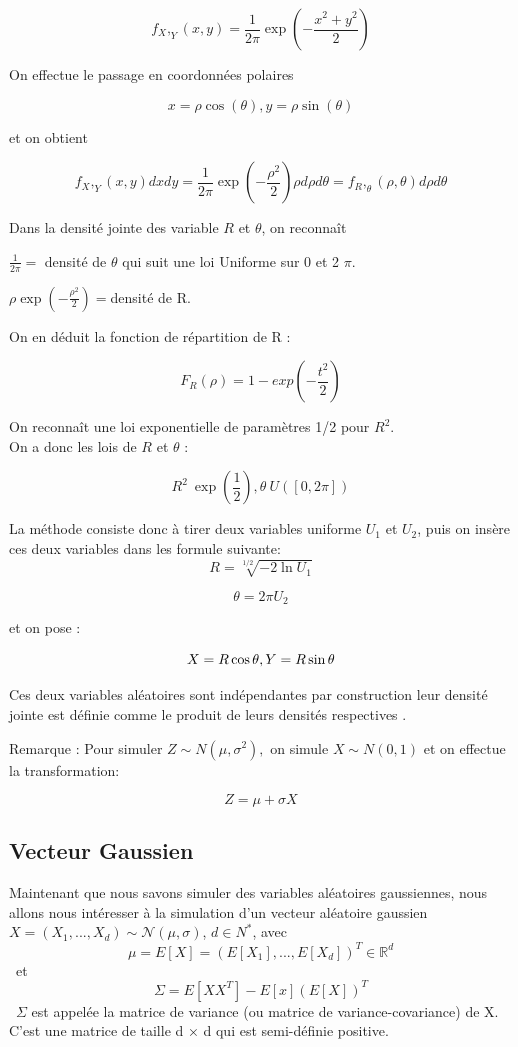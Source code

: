 \documentclass[10pt]{article} %
\begin{document}
$$f_X,_Y(x,y) = \frac{1}{2\pi}\exp(-\frac {x^2+y^2}{2})$$

On effectue le passage en coordonnées polaires

$$x = \rho \cos(\theta), y = \rho \sin(\theta)$$

et on obtient

$$f_X,_Y(x,y)dxdy = \frac {1}{2\pi}\exp(-\frac {\rho^2}{2})\rho d\rho d\theta = f_R,_\theta(\rho,\theta)d\rho d\theta$$

Dans la densité jointe des variable $R$ et $\theta$, on reconnaît

$\frac{1}{2\pi} =$ densité de $\theta$ qui suit une loi Uniforme sur 0 et 2 $\pi$.


$\rho \exp(-\frac{\rho^2}{2}) = $densité de R.

On en déduit la fonction de répartition de R :

$$F_R(\rho) = 1- exp(-\frac{t^2}{2})$$

On reconnaît une loi exponentielle de paramètres 1/2 pour $R^2$.\\
On a donc les lois de $R$ et  $\theta$ :

$$R^2 ~ \exp(\frac{1}{2}), \theta ~ U([0, 2\pi])$$

La méthode consiste donc à tirer deux variables uniforme $U_1$ et $U_2$, puis on insère ces deux variables dans les formule suivante: \\

$$R = \sqrt[1/2]{-2 \ln U_1}$$

$$\theta = 2\pi U_2$$

et on pose :

$$X = R\cos\theta, \\
Y = R\sin\theta$$

Ces deux variables aléatoires sont indépendantes par construction leur densité jointe est définie comme le produit de leurs densités respectives .

Remarque : Pour simuler $Z \sim N (\mu, \sigma^2 ),$ on simule $X \sim N (0, 1)$ et on effectue la transformation:

 $$Z = \mu + \sigma X$$

 \subsection{Vecteur Gaussien}
 Maintenant que nous savons simuler des variables aléatoires gaussiennes, nous allons nous intéresser à la simulation d’un
 vecteur aléatoire gaussien $X = (X_1, ... ,X_d) \sim \mathcal{N}(\mu , \sigma)$,  $d \in  N^*$, avec \
            $$ \mu = E[X] = (E[X_1], ... ,E[X_d])^T \in \mathbb{R}^d $$ \
     et \
             $$\Sigma = E[XX^T] - E[x](E[X])^T $$ \
 $\Sigma$ est appelée la matrice de variance (ou matrice de variance-covariance) de X. C’est une matrice de taille d × d qui est semi-définie positive.
\end{document}
